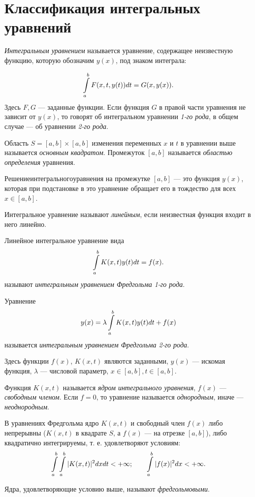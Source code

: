 \section{Классификация интегральных уравнений}
\label{sec:q-32}
\textit{Интегральным уравнением} называется уравнение, содержащее неизвестную функцию, которую обозначим $y(x)$, под знаком интеграла:

$$\int\displaylimits_{a}^{b}F(x, t, y(t)) dt = G(x, y(x)).$$
Здесь $F, G$ --- заданные функции. Если функция $G$ в правой части уравнения не зависит от $y(x)$, то говорят об интегральном уравнении \textit{1-го рода}, в общем случае --- об уравнении \textit{2-го рода}.

Область $S = [a, b] \times [a, b]$ изменения переменных $x$ и $t$ в уравнении выше называется \textit{основным квадратом}. Промежуток $[a, b]$ называется \textit{областью определения} уравнения.

$Решение интегрального уравнения$ на промежутке $[a, b]$ --- это функция $y(x)$, которая при подстановке в это уравнение обращает его в тождество для всех $x \in [a, b]$.

Интегральное уравнение называют \textit{линейным}, если неизвестная функция входит в него линейно.

Линейное интегральное уравнение вида
$$\int\displaylimits_{a}^{b}K(x, t) y(t) dt = f(x).$$
называют \textit{интегральным уравнением Фредгольма 1-го рода}.

Уравнение
\begin{equation}
	y(x) = \lambda \int\displaylimits_{a}^{b}K(x, t)y(t)dt + f(x) \label{eq:1}
\end{equation}
называется \textit{интегральным уравнением Фредгольма 2-го рода}.

Здесь функции $f(x)$, $K(x,t)$ являются заданными, $y(x)$ --- искомая функция, $\lambda$ --- числовой параметр, $x \in [a,b], t \in [a, b]$.

Функция $K(x, t)$ называется \textit{ядром интегрального уравнения}, $f(x)$ --- \textit{свободным членом}. Если $f = 0$, то уравнение называется \textit{однородным}, иначе --- \textit{неоднородным}.

В уравнениях Фредгольма ядро $K(x, t)$ и свободный член $f(x)$ либо непрерывны ($K(x, t)$ в квадрате $S$, а $f(x)$ --- на отрезке $[a, b]$), либо квадратично интегрируемы, т. е. удовлетворяют условиям:
$$\int\displaylimits_a^b\int\displaylimits_a^b|K(x, t)|^2dxdt < + \infty; \qquad \int\displaylimits_a^b|f(x)|^2 dx < + \infty.$$

Ядра, удовлетворяющие условию выше, называют \textit{фредгольмовыми}.

